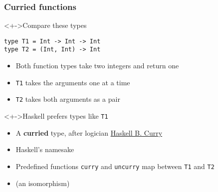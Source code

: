 \documentclass{beamer}
\begin{document}
\begin{frame}[fragile]
  \frametitle{Curried functions}

\begin{block}<+->{Compare these types}
\begin{verbatim}
type T1 = Int -> Int -> Int
type T2 = (Int, Int) -> Int
\end{verbatim}
\begin{itemize}
\item Both function types take two integers and return one
\item \texttt{T1} takes the arguments one at a time
\item \texttt{T2} takes both arguments as a pair
\end{itemize}
\end{block}
\begin{block}<+->{Haskell prefers types like \texttt{T1}}
  \begin{itemize}
  \item A \textbf{curried} type, after logician \href{https://en.wikipedia.org/wiki/Haskell_Curry}{Haskell B. Curry}
  \item Haskell's namesake
  \item Predefined functions \texttt{curry} and \texttt{uncurry} map between \texttt{T1} and \texttt{T2}
  \item (an isomorphism)
  \end{itemize}
\end{block}
\end{frame}
\end{document}
